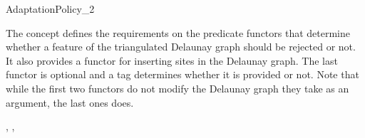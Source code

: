 


\begin{ccRefConcept}{AdaptationPolicy_2}

\ccDefinition

The concept  defines the requirements on
the predicate functors that determine whether a feature of the
triangulated Delaunay graph should be rejected or not. It also
provides a functor for inserting sites in the Delaunay graph. The last
functor is optional and a tag determines whether it is provided or
not. Note that while the first two functors do not modify the Delaunay
graph they take as an argument, the last ones does.

\ccRefines
{}, , 


\end{ccRefConcept}
